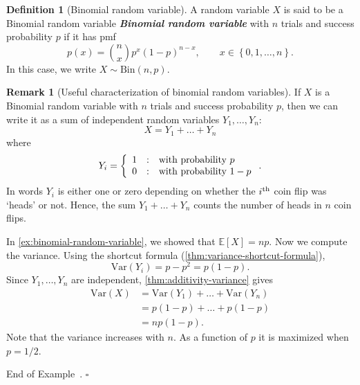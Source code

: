 \documentclass[10pt]{article}
\theoremstyle{definition}
\newtheorem{definition}[theorem]{Definition}
\newtheorem{remark}[theorem]{Remark}
\newtheorem{example}[theorem]{Example}
\renewenvironment{example}
{\begin{oldexample}}
  {\par\smallskip\hfill   End of Example~\theexample. $\square$    \par\end{oldexample}}
\newcommand{\1}[1]{\textbf{1}_{\left[#1\right]}} %
\def\E{\mathbb{E}} %
\def\Var{\mathrm{Var}} %
\DeclareRobustCommand{\demph}[1]{%
  \ifmmode
  {\color{Blue}#1}%
  \else
  {\color{Blue}\bfseries\slshape #1}%
  \fi
}
\begin{document}
\begin{definition}[Binomial random variable]
  \label{def:binomial-random-variable}
  A random variable  $X$ is said to be a \demph{Binomial random variable} with $n$
  trials and success probability $p$ if it has pmf
  \begin{equation*}
    p(x) = {n\choose x} p^{x}(1-p)^{n-x}, \qquad x\in \left\{0,1,\ldots,n\right\}.
  \end{equation*}
  In this case, we write $X\sim \text{Bin}(n,p)$.
\end{definition}

\begin{remark}[Useful characterization of binomial random variables]
  \label{rmk:useful-characterization-binomial-random-variables}
  If $X$ is a Binomial random variable with $n$ trials and success probability
  $p$, then we can write it as a sum of independent random variables
  $Y_{1},\ldots,Y_{n}$:
  \begin{equation*}
    X = Y_{1}+\ldots+Y_{n}
  \end{equation*}
  where
  \begin{equation*}
    Y_{i} = \left\{ \begin{array}{l@{\quad:\quad}l} 1 & \text{with probability
        }p\\0 & \text{with probability }1-p \end{array}\right..
  \end{equation*}
  In words $Y_{i}$ is either one or zero depending on whether the
  $i^{\rm th}$ coin flip was `heads' or not. Hence, the sum
  $Y_{1}+\ldots+Y_{n}$ counts the number of heads in $n$ coin flips.
\end{remark}

\begin{example}[Variance of binomial rv]
  \label{ex:variance-binomial-rv}

  In \cref{ex:binomial-random-variable}, we showed that $\E[X] = np$. Now we
  compute the variance. Using the shortcut formula (\cref{thm:variance-shortcut-formula}),
  \begin{equation*}
    \Var(Y_{i}) = p-p^{2} = p(1-p).
  \end{equation*}
  Since $Y_{1},\ldots,Y_{n}$ are independent, \cref{thm:additivity-variance}
  gives
  \begin{align*}
    \Var(X) 
    &= \Var(Y_{1})+\ldots +\Var(Y_{n})\\
    &=p(1-p)+\ldots+p(1-p)\\
    &=np(1-p).
  \end{align*}
  Note that the variance increases with $n$. As a function of $p$ it is
  maximized when $p=1/2$.
\end{example}
\end{document}
